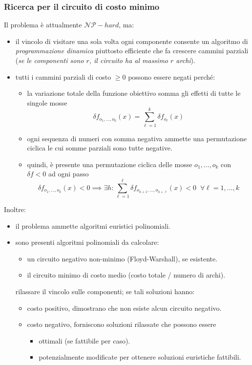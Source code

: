 \documentclass{article}
\begin{document}
\subsubsection{Ricerca per il circuito di costo minimo}
Il problema è attualmente $\mathcal{NP}-hard$, ma:
\begin{itemize}
    \item il vincolo di visitare una sola volta ogni componente consente un algoritmo di
    \textit{programmazione dinamica} piuttosto efficiente che fa crescere cammini parziali
    (\textit{se le componenti sono $r$, il circuito ha al massimo $r$ archi}).
    \item tutti i cammini parziali di costo $\geq 0$ possono essere negati perché:
    \begin{itemize}
        \item la variazione totale della funzione obiettivo somma gli effetti di tutte le
        singole mosse
        $$\delta f_{o_1,\dots,o_k}(x)=\sum_{\ell=1}^k \delta f_{o_\ell}(x)$$
        \item ogni sequenza di numeri con somma negativa ammette una permutazione ciclica le
        cui somme parziali sono tutte negative.
        \item quindi, è presente una permutazione ciclica delle mosse $o_1,\dots,o_k$ con $\delta f<0$
        ad ogni passo
        $$\delta f_{o_1,\dots,o_k}(x)<0\implies\exists h:\sum_{\ell=1}^\ell \delta f_{o_{h+1},\dots,o_{h+\ell}}(x)<0\;\;\forall\ell=1,\dots,k$$
    \end{itemize}
\end{itemize}
Inoltre:
\begin{itemize}
    \item il problema ammette algoritmi euristici polinomiali.
    \item sono presenti algoritmi polinomiali da calcolare:
    \begin{itemize}
        \item un circuito negativo non-minimo (Floyd-Warshall), se esistente.
        \item il circuito minimo di costo medio (costo totale / numero di archi).
    \end{itemize}
    rilassare il vincolo sulle componenti; se tali soluzioni hanno:
    \begin{itemize}
        \item costo positivo, dimostrano che non esiste alcun circuito negativo.
        \item costo negativo, forniscono soluzioni rilassate che possono essere
        \begin{itemize}
            \item ottimali (se fattibile per caso).
            \item potenzialmente modificate per ottenere soluzioni euristiche fattibili.
        \end{itemize}
    \end{itemize}
\end{itemize}
\end{document}
